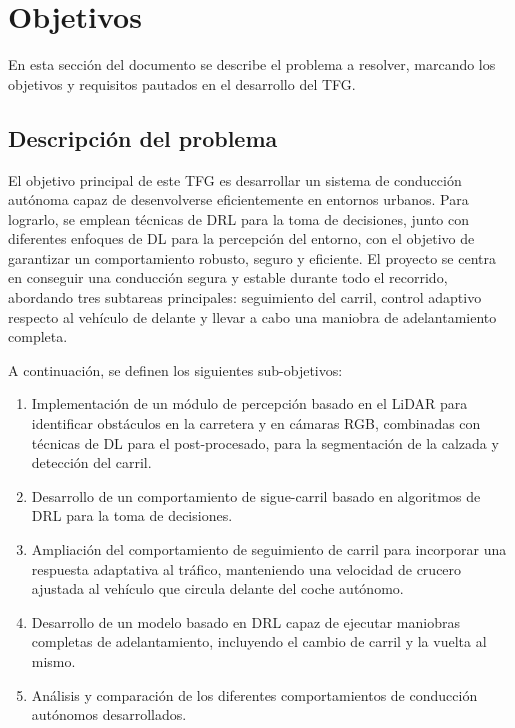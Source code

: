 \chapter{Objetivos}
\label{cap:capitulo2}

En esta sección del documento se describe el problema a resolver, marcando los objetivos y requisitos pautados en el desarrollo del \ac{TFG}.

\section{Descripción del problema}
\label{sec:descripcion}

El objetivo principal de este \ac{TFG} es desarrollar un sistema de conducción autónoma capaz de desenvolverse eficientemente en entornos urbanos. Para lograrlo, se emplean técnicas de \ac{DRL} para la toma de decisiones, junto con diferentes enfoques de \ac{DL} para la percepción del entorno, con el objetivo de garantizar un comportamiento robusto, seguro y eficiente. El proyecto se centra en conseguir una conducción segura y estable durante todo el recorrido, abordando tres subtareas principales: seguimiento del carril, control adaptivo respecto al vehículo de delante y llevar a cabo una maniobra de adelantamiento completa.

A continuación, se definen los siguientes sub-objetivos: 

\begin{enumerate}
\item Implementación de un módulo de percepción basado en el \ac{LiDAR} para identificar obstáculos en la carretera y en cámaras RGB, combinadas con técnicas de \ac{DL} para el post-procesado, para la segmentación de la calzada y detección del carril.
\item Desarrollo de un comportamiento de sigue-carril basado en algoritmos de \ac{DRL} para la toma de decisiones.
\item Ampliación del comportamiento de seguimiento de carril para incorporar una respuesta adaptativa al tráfico, manteniendo una velocidad de crucero ajustada al vehículo que circula delante del coche autónomo.
\item Desarrollo de un modelo basado en \ac{DRL} capaz de ejecutar maniobras completas de adelantamiento, incluyendo el cambio de carril y la vuelta al mismo.
\item Análisis y comparación de los diferentes comportamientos de conducción autónomos desarrollados.
\end{enumerate}

